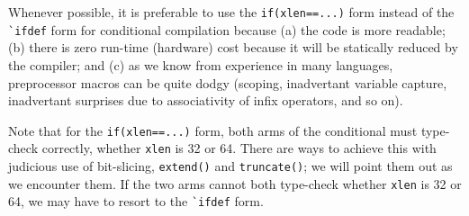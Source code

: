 Whenever possible, it is preferable to use the \verb|if(xlen==...)|
form instead of the \verb|`ifdef| form for conditional compilation
because (a) the code is more readable; (b) there is zero run-time
(hardware) cost because it will be statically reduced by the compiler;
and (c) as we know from experience in many languages, preprocessor
macros can be quite dodgy (scoping, inadvertant variable capture,
inadvertant surprises due to associativity of infix operators, and so
on).

Note that for the \verb|if(xlen==...)| form, both arms of the
conditional must type-check correctly, whether \verb|xlen| is 32 or
64.  There are ways to achieve this with judicious use of bit-slicing,
\verb|extend()| and \verb|truncate()|; we will point them out as we
encounter them.  If the two arms cannot both type-check whether
\verb|xlen| is 32 or 64, we may have to resort to the \verb|`ifdef|
form.

